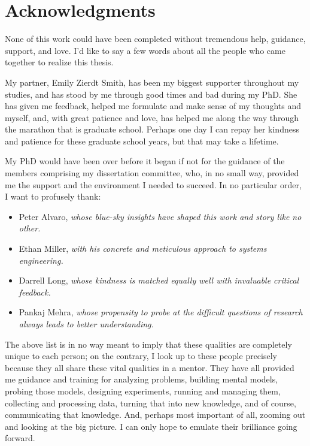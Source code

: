 

\begingroup
\let\clearpage\relax
\let\cleardoublepage\relax
\let\cleardoublepage\relax
\chapter*{Acknowledgments}

None of this work could have been completed without tremendous help, guidance, support, and love. I'd like to say a few
words about all the people who came together to realize this thesis.

My partner, Emily Zierdt Smith, has been my biggest supporter throughout my studies, and has stood by me through good times and bad
during my PhD. She has given me feedback, helped me formulate and make sense of my thoughts and myself, and, with great
patience and love, has helped me along the way through the marathon that is graduate school. Perhaps one day I can repay
her kindness and patience for these graduate school years, but that may take a lifetime.

My PhD would have been over before it began if not for the guidance of the members comprising my dissertation committee, who, in no small way,
provided me the support and the environment I needed to succeed. In no particular order, I want to profusely thank:

\begin{itemize}
    \item Peter Alvaro, \emph{whose blue-sky insights have shaped this work and story like no other.}
    \item Ethan Miller, \emph{with his concrete and meticulous approach to systems engineering.}
    \item Darrell Long, \emph{whose kindness is matched equally well with invaluable critical feedback.}
    \item Pankaj Mehra, \emph{whose propensity to probe at the difficult questions of research always leads to better understanding.}
\end{itemize}

The above list is in no way meant to imply that these qualities are completely unique to each person; on the contrary,
I look up to these people precisely because they all share these vital qualities in a mentor. They have all provided me
guidance and training for analyzing problems, building mental models, probing those models, designing experiments,
running and managing them, collecting and processing data, turning that into new knowledge, and of course, communicating
that knowledge. And, perhaps most important of all, zooming out and looking at the big picture. I can only hope to
emulate their brilliance going forward.

